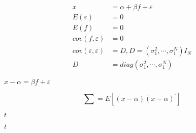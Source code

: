 \documentclass[10pt]{book}
\begin{document}
\begin{mdSnippets}
\begin{mdDisplaySnippet}[241cc0862a03c3f0cb7c5c6ad8ef3f5f]%
\[%
\begin{aligned}
x &= \alpha+\beta f+\varepsilon  \\ 
E(\varepsilon) &= 0\\ 
E(f)&= 0\\ 
 cov(f,\varepsilon)&=0 \\ 
 cov(\varepsilon,\varepsilon)&= D,D=(\sigma_1^2,\cdots ,\sigma_1^N)I_N\\ 
 D&= diag(\sigma_1^2,\cdots ,\sigma_1^N)
\end{aligned}
\]%
\end{mdDisplaySnippet}%
\begin{mdInlineSnippet}%
$x-\alpha=\beta f+\varepsilon$\end{mdInlineSnippet}%
\begin{mdDisplaySnippet}%
\[%
\sum=E[(x-\alpha)(x-\alpha)^']
\]%
\end{mdDisplaySnippet}%
\begin{mdInlineSnippet}[e358efa489f58062f10dd7316b65649e]%
$t$\end{mdInlineSnippet}%
\begin{mdInlineSnippet}[e358efa489f58062f10dd7316b65649e]%
$t$\end{mdInlineSnippet}%

\end{mdSnippets}
\end{document}
